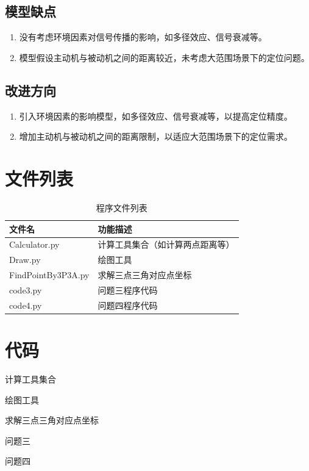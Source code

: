 \documentclass[withoutpreface,bwprint]{cumcmthesis} %
\begin{document}
\subsection{模型缺点}
\begin{enumerate}
    \item 没有考虑环境因素对信号传播的影响，如多径效应、信号衰减等。
    \item 模型假设主动机与被动机之间的距离较近，未考虑大范围场景下的定位问题。
\end{enumerate}

\subsection{改进方向}
\begin{enumerate}
    \item 引入环境因素的影响模型，如多径效应、信号衰减等，以提高定位精度。
    \item 增加主动机与被动机之间的距离限制，以适应大范围场景下的定位需求。
\end{enumerate}




\begin{appendices}

\section{文件列表}
\begin{table}[H]
    \caption{程序文件列表}
    \centering
    \begin{tabularx}{\textwidth}{l X}
        \bottomrule
        文件名 & 功能描述 \\
        \midrule
        Calculator.py & 计算工具集合（如计算两点距离等） \\
        Draw.py & 绘图工具 \\
        FindPointBy3P3A.py & 求解三点三角对应点坐标 \\
        code3.py & 问题三程序代码 \\
        code4.py & 问题四程序代码 \\
        \bottomrule
    \end{tabularx}
    \label{tab:文件列表}
\end{table}

\section{代码}
计算工具集合

绘图工具

求解三点三角对应点坐标

问题三

问题四


\end{appendices}
\end{document}
